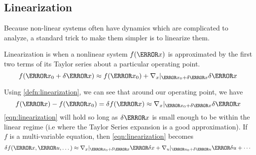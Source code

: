 \subsection{Linearization} %
Because non-linear systems often have dynamics which are complicated to analyze, a standard trick to make them simpler is to linearize them.
\begin{definition}
  Linearization is when a nonlinear system $f(\V{x})$ is approximated by the first two terms of its Taylor series about a particular operating point.
  \[
	f(\V{x}_0 + \delta \V{x}) \approx f(\V{x}_0) + \nabla_x|_{\V{x}_0+\delta\V{x}}\delta\V{x}
  \]
  \label{defn:linearization}
\end{definition}
Using \cref{defn:linearization}, we can see that around our operating point, we have
\begin{equation}
  f(\V{x}) - f(\V{x}_0) = \delta f(\V{x}) \approx \nabla_x|_{\V{x}_0+\delta\V{x}} \delta\V{x}
  \label{eqn:linearization}
\end{equation}
\cref{eqn:linearization} will hold so long as $\delta\V{x}$ is small enough to be within the linear regime (i.e where the Taylor Series expansion is a good approximation).
If $f$ is a multi-variable equation, then \cref{eqn:linearization} becomes
\[
  \delta f(\V{x}, \V{u}, \dots) \approx \nabla_x|_{\V{x}_0+\delta\V{x}} \V{\delta x} + \nabla_u|_{\V{u}_0+\delta\V{u}} \V{\delta u} + \cdots
  \]

